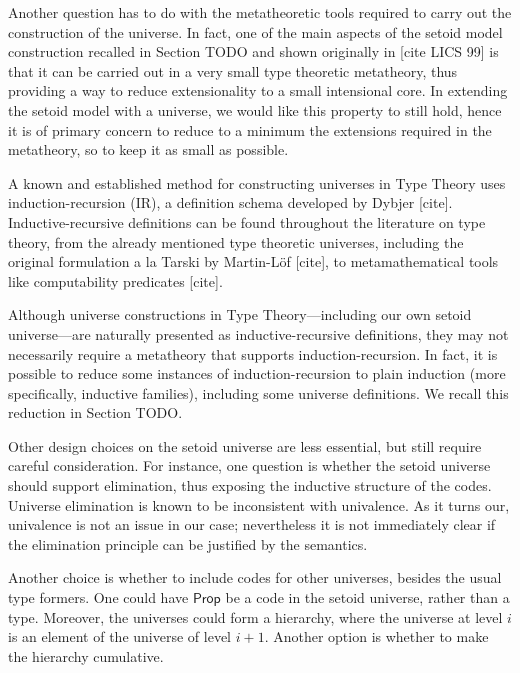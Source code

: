 \documentclass{easychair}
\newcommand{\Prop}{\textsf{Prop}}
\begin{document}
Another question has to do with the metatheoretic tools required to carry out
the construction of the universe. In fact, one of the main aspects of the setoid
model construction recalled in Section TODO and shown originally in [cite LICS
  99] is that it can be carried out in a very small type theoretic metatheory,
thus providing a way to reduce extensionality to a small intensional core.
%
In extending the setoid model with a universe, we would like this property to
still hold, hence it is of primary concern to reduce to a minimum the extensions
required in the metatheory, so to keep it as small as possible.

A known and established method for constructing universes in Type Theory uses
induction-recursion (IR), a definition schema developed by Dybjer
[cite]. Inductive-recursive definitions can be found throughout the literature
on type theory, from the already mentioned type theoretic universes, including
the original formulation a la Tarski by Martin-L\"of [cite], to metamathematical
tools like computability predicates [cite].

Although universe constructions in Type Theory---including our own setoid
universe---are naturally presented as inductive-recursive definitions, they
may not necessarily require a metatheory that supports induction-recursion. In
fact, it is possible to reduce some instances of induction-recursion to plain
induction (more specifically, inductive families), including some universe
definitions. We recall this reduction in Section TODO.


Other design choices on the setoid universe are less essential, but still
require careful consideration. For instance, one question is whether the setoid
universe should support elimination, thus exposing the inductive structure of
the codes. Universe elimination is known to be inconsistent with univalence. As
it turns our, univalence is not an issue in our case; nevertheless it is not
immediately clear if the elimination principle can be justified by the
semantics.

Another choice is whether to include codes for other universes, besides the
usual type formers. One could have $\Prop$ be a code in the setoid universe,
rather than a type. Moreover, the universes could form a hierarchy, where the
universe at level $i$ is an element of the universe of level $i+1$. Another
option is whether to make the hierarchy cumulative.
\end{document}
